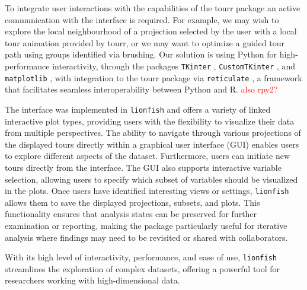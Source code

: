 \documentclass[article]{ajs}
\begin{document}
To integrate user interactions with the capabilities of the tourr package an active communication with the interface is required. For example, we may wish to explore the local neighbourhood of a projection selected by the user with a local tour animation provided by tourr, or we may want to optimize a guided tour path using groups identified via brushing.
Our solution is using Python for high-performance interactivity, through the packages \texttt{TKinter} \citep{lundh1999introduction}, \texttt{CustomTKinter} \citep{schimansky24}, and \texttt{matplotlib} \citep{Hunter:2007}, with integration to the tourr package \citep{tourr} via \texttt{reticulate} \citep{reticulate}, a framework that facilitates seamless interoperability between Python and R.
\textcolor{red}{also rpy2?}


The interface was implemented in \texttt{lionfish} and offers a variety of linked interactive plot types, providing users with the flexibility to visualize their data from multiple perspectives. The ability to navigate through various projections of the displayed tours directly within a graphical user interface (GUI) enables users to explore different aspects of the dataset. Furthermore, users can initiate new tours directly from the interface. The GUI also supports interactive variable selection, allowing users to specify which subset of variables should be visualized in the plots. Once users have identified interesting views or settings, \texttt{lionfish} allows them to save the displayed projections, subsets, and plots. This functionality ensures that analysis states can be preserved for further examination or reporting, making the package particularly useful for iterative analysis where findings may need to be revisited or shared with collaborators.

With its high level of interactivity, performance, and ease of use, \texttt{lionfish} streamlines the exploration of complex datasets, offering a powerful tool for researchers working with high-dimensional data.
\end{document}
